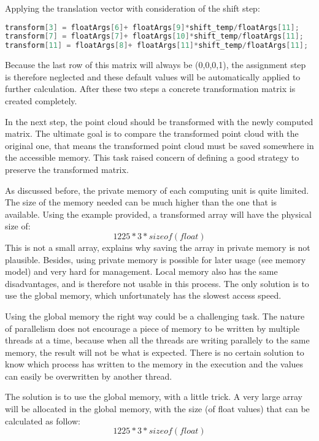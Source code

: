 Applying the translation vector with consideration of the shift step:
\begin{lstlisting}[language=C]
transform[3] = floatArgs[6]+ floatArgs[9]*shift_temp/floatArgs[11];
transform[7] = floatArgs[7]+ floatArgs[10]*shift_temp/floatArgs[11];
transform[11] = floatArgs[8]+ floatArgs[11]*shift_temp/floatArgs[11];
\end{lstlisting}
Because the last row of this matrix will always be (0,0,0,1), the assignment step is therefore neglected and these default values will be automatically applied to further calculation. After these two steps a concrete transformation matrix is created completely.

In the next step, the point cloud should be transformed with the newly computed matrix. The ultimate goal is to compare the transformed point cloud with the original one, that means the transformed point cloud must be saved somewhere in the accessible memory. This task raised concern of defining a good strategy to preserve the transformed matrix.

As discussed before, the private memory of each computing unit is quite limited. The size of the memory needed can be much higher than the one that is available. Using the example provided, a transformed array will have the physical size of:
\begin{equation*}
    1225*3*sizeof(float)
\end{equation*}
This is not a small array, explains why saving the array in private memory is not plausible. Besides, using private memory is possible for later usage (see memory model) and very hard for management. Local memory also has the same disadvantages, and is therefore not usable in this process. The only solution is to use the global memory, which unfortunately has the slowest access speed.

Using the global memory the right way could be a challenging task. The nature of parallelism does not encourage a piece of memory to be written by multiple threads at a time, because when all the threads are writing parallely to the same memory, the result will not be what is expected. There is no certain solution to know which process has written to the memory in the execution and the values can easily be overwritten by another thread. 

The solution is to use the global memory, with a little trick. A very large array will be allocated in the global memory, with the size (of float values) that can be calculated as follow:
\begin{equation*}
    1225*3*sizeof(float)
\end{equation*}

